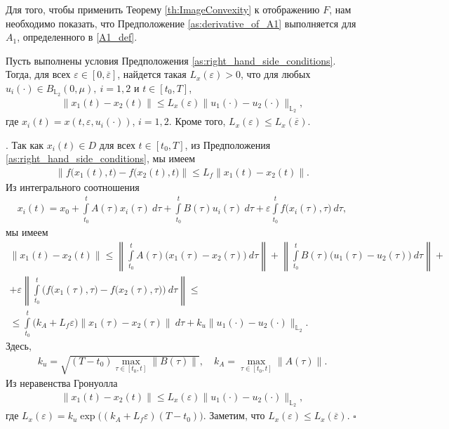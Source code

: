 \documentclass[../main.tex]{subfiles}
\begin{document}
Для того, чтобы применить Теорему \ref{th:ImageConvexity} к отображению $F$,  нам необходимо показать, что Предположение \ref{as:derivative_of_A1} выполняется для $A_1$, определенного в \eqref{A1_def}.
\begin{lemma}\label{lem:Lipx}
	Пусть выполнены условия Предположения \ref{as:right_hand_side_conditions}. Тогда, для всех $\varepsilon\in [0,\overline{\varepsilon}]$, найдется такая $L_x(\varepsilon) > 0$, что для любых $u_i(\cdot) \in B_{\mathbb{L}_2}(0,\mu), \ i = 1,2$ и $t \in [t_0,T]$, 
	\begin{gather*}
		\| x_1(t) - x_2(t) \| \leqslant L_x(\varepsilon) \| u_1(\cdot) - u_2(\cdot) \|_{\mathbb{L}_2},
	\end{gather*}
	где $x_i(t) = x(t,\varepsilon,u_i(\cdot))$, $i = 1,2$. Кроме того, $L_x(\varepsilon) \leqslant L_x(\overline{\varepsilon})$. 
\end{lemma}
\doc.
Так как $x_i(t) \in D$ для всех $t\in [t_0,T]$, из Предположения \ref{as:right_hand_side_conditions}, мы имеем
\begin{gather*}
	\|f\big(x_1(t),t\big) - f\big(x_2(t),t\big)\| \leqslant L_f\|x_1(t) -  x_2(t)\|.
\end{gather*}
Из интегрального соотношения
\begin{gather}\label{nonlinear_solution}
	x_i(t) = x_0 + \int\limits_{t_0}^t A(\tau)x_i(\tau)\ d\tau + \int\limits_{t_0}^t B(\tau)u_i(\tau)\ d\tau+
	\varepsilon\int\limits_{t_0}^t f\big(x_i(\tau),\tau\big)\ d\tau,
\end{gather}
мы имеем
\begin{gather*}
	\| x_1(t) - x_2(t) \| \leqslant
	\left\| \int\limits_{t_0}^t A(\tau)\big(x_1(\tau) - x_2(\tau)\big)\ d\tau \right\| + 
	\left\|\int\limits_{t_0}^t B(\tau) \big(u_1(\tau) - u_2(\tau)\big)\ d\tau   \right\| + \\ +
	\varepsilon \left\| \int\limits_{t_0}^t \Big( f\big(x_1(\tau),\tau\big) - f\big(x_2(\tau),\tau\big) \Big)\ d\tau   \right\|  
	\leqslant \\ \leqslant
	\int\limits_{t_0}^t \big(k_A + L_f \varepsilon) \left\| x_1(\tau) - x_2(\tau)\right\| \ d\tau + k_u \| u_1(\cdot) - u_2(\cdot) \|_{\mathbb{L}_2}.
\end{gather*}
Здесь, 
\begin{gather*}
	k_u = \sqrt{(T-t_0) \max\limits_{\tau \in [{t_0},t]}\|B(\tau)\|}, \quad k_A =\max\limits_{\tau \in [{t_0},t]} \| A(\tau)\|.
\end{gather*}
Из неравенства Гронуолла 
\begin{gather*}
	\| x_1(t) - x_2(t) \| \leqslant L_x(\varepsilon) \| u_1(\cdot) - u_2(\cdot) \|_{\mathbb{L}_2},
\end{gather*}
где $L_x(\varepsilon) = k_u \exp\big((k_A + L_f \varepsilon)(T - t_0)\big) $. Заметим, что $L_x(\varepsilon) \leqslant L_x(\overline{\varepsilon})$. 
\hfill$\square$\\[1ex]%
\end{document}
